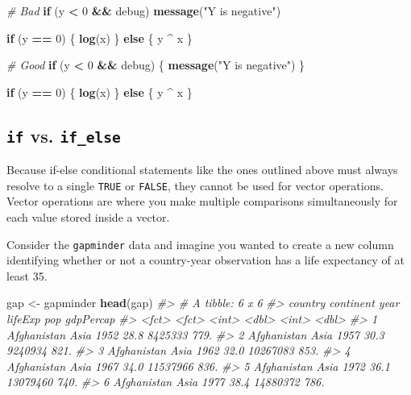 \documentclass[]{book}
\newenvironment{Shaded}{\begin{snugshade}}{\end{snugshade}}
\newcommand{\KeywordTok}[1]{\textcolor[rgb]{0.13,0.29,0.53}{\textbf{#1}}}
\newcommand{\DecValTok}[1]{\textcolor[rgb]{0.00,0.00,0.81}{#1}}
\newcommand{\StringTok}[1]{\textcolor[rgb]{0.31,0.60,0.02}{#1}}
\newcommand{\CommentTok}[1]{\textcolor[rgb]{0.56,0.35,0.01}{\textit{#1}}}
\newcommand{\ControlFlowTok}[1]{\textcolor[rgb]{0.13,0.29,0.53}{\textbf{#1}}}
\newcommand{\OperatorTok}[1]{\textcolor[rgb]{0.81,0.36,0.00}{\textbf{#1}}}
\newcommand{\NormalTok}[1]{#1}
\begin{document}
\begin{Shaded}
\begin{Highlighting}[]
\CommentTok{# Bad}
\ControlFlowTok{if}\NormalTok{ (y }\OperatorTok{<}\StringTok{ }\DecValTok{0} \OperatorTok{&&}\StringTok{ }\NormalTok{debug)}
\KeywordTok{message}\NormalTok{(}\StringTok{"Y is negative"}\NormalTok{)}

\ControlFlowTok{if}\NormalTok{ (y }\OperatorTok{==}\StringTok{ }\DecValTok{0}\NormalTok{) \{}
  \KeywordTok{log}\NormalTok{(x)}
\NormalTok{\} }
\ControlFlowTok{else}\NormalTok{ \{}
\NormalTok{  y }\OperatorTok{^}\StringTok{ }\NormalTok{x}
\NormalTok{\}}

\CommentTok{# Good}
\ControlFlowTok{if}\NormalTok{ (y }\OperatorTok{<}\StringTok{ }\DecValTok{0} \OperatorTok{&&}\StringTok{ }\NormalTok{debug) \{}
  \KeywordTok{message}\NormalTok{(}\StringTok{"Y is negative"}\NormalTok{)}
\NormalTok{\}}

\ControlFlowTok{if}\NormalTok{ (y }\OperatorTok{==}\StringTok{ }\DecValTok{0}\NormalTok{) \{}
  \KeywordTok{log}\NormalTok{(x)}
\NormalTok{\} }\ControlFlowTok{else}\NormalTok{ \{}
\NormalTok{  y }\OperatorTok{^}\StringTok{ }\NormalTok{x}
\NormalTok{\}}
\end{Highlighting}
\end{Shaded}

\subsection{\texorpdfstring{\texttt{if} vs.
\texttt{if\_else}}{if vs. if\_else}}\label{if-vs.-if_else}

Because if-else conditional statements like the ones outlined above must
always resolve to a single \texttt{TRUE} or \texttt{FALSE}, they cannot
be used for vector operations. Vector operations are where you make
multiple comparisons simultaneously for each value stored inside a
vector.

Consider the \texttt{gapminder} data and imagine you wanted to create a
new column identifying whether or not a country-year observation has a
life expectancy of at least 35.

\begin{Shaded}
\begin{Highlighting}[]
\NormalTok{gap <-}\StringTok{ }\NormalTok{gapminder}
\KeywordTok{head}\NormalTok{(gap)}
\CommentTok{#> # A tibble: 6 x 6}
\CommentTok{#>   country     continent  year lifeExp      pop gdpPercap}
\CommentTok{#>   <fct>       <fct>     <int>   <dbl>    <int>     <dbl>}
\CommentTok{#> 1 Afghanistan Asia       1952    28.8  8425333      779.}
\CommentTok{#> 2 Afghanistan Asia       1957    30.3  9240934      821.}
\CommentTok{#> 3 Afghanistan Asia       1962    32.0 10267083      853.}
\CommentTok{#> 4 Afghanistan Asia       1967    34.0 11537966      836.}
\CommentTok{#> 5 Afghanistan Asia       1972    36.1 13079460      740.}
\CommentTok{#> 6 Afghanistan Asia       1977    38.4 14880372      786.}
\end{Highlighting}
\end{Shaded}
\end{document}
